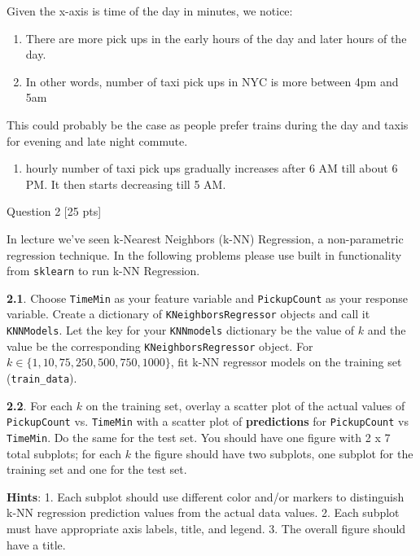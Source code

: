 \documentclass[11pt]{article}
\providecommand{\tightlist}{%
      \setlength{\itemsep}{0pt}\setlength{\parskip}{0pt}}
\begin{document}
Given the x-axis is time of the day in minutes, we notice:

\begin{enumerate}
\def\labelenumi{(\alph{enumi})}
\item
  There are more pick ups in the early hours of the day and later hours
  of the day.
\item
  In other words, number of taxi pick ups in NYC is more between 4pm and
  5am
\end{enumerate}

This could probably be the case as people prefer trains during the day
and taxis for evening and late night commute.

\begin{enumerate}
\def\labelenumi{(\alph{enumi})}
\setcounter{enumi}{2}
\tightlist
\item
  hourly number of taxi pick ups gradually increases after 6 AM till
  about 6 PM. It then starts decreasing till 5 AM.
\end{enumerate}

    Question 2 {[}25 pts{]}

In lecture we've seen k-Nearest Neighbors (k-NN) Regression, a
non-parametric regression technique. In the following problems please
use built in functionality from \texttt{sklearn} to run k-NN Regression.

\textbf{2.1}. Choose \texttt{TimeMin} as your feature variable and
\texttt{PickupCount} as your response variable. Create a dictionary of
\texttt{KNeighborsRegressor} objects and call it \texttt{KNNModels}. Let
the key for your \texttt{KNNmodels} dictionary be the value of \(k\) and
the value be the corresponding \texttt{KNeighborsRegressor} object. For
\(k \in \{1, 10, 75, 250, 500, 750, 1000\}\), fit k-NN regressor models
on the training set (\texttt{train\_data}).

\textbf{2.2}. For each \(k\) on the training set, overlay a scatter plot
of the actual values of \texttt{PickupCount} vs. \texttt{TimeMin} with a
scatter plot of \textbf{predictions} for \texttt{PickupCount} vs
\texttt{TimeMin}. Do the same for the test set. You should have one
figure with 2 x 7 total subplots; for each \(k\) the figure should have
two subplots, one subplot for the training set and one for the test set.

\textbf{Hints}: 1. Each subplot should use different color and/or
markers to distinguish k-NN regression prediction values from the actual
data values. 2. Each subplot must have appropriate axis labels, title,
and legend. 3. The overall figure should have a title.
\end{document}
